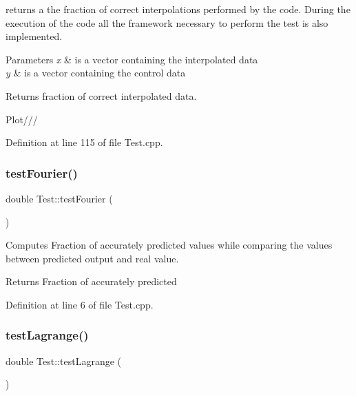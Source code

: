 returns a the fraction of correct interpolations performed by the code. During the execution of the code all the framework necessary to perform the test is also implemented. 


\begin{DoxyParams}{Parameters}
{\em x} & is a vector containing the interpolated data \\
\hline
{\em y} & is a vector containing the control data \\
\hline
\end{DoxyParams}
\begin{DoxyReturn}{Returns}
fraction of correct interpolated data. 
\end{DoxyReturn}
Plot/// 

Definition at line 115 of file Test.\+cpp.

\mbox{\label{class_test_a4789b9d0192ae0a3c6f88a7777a6bc57}} 
\subsubsection{\texorpdfstring{test\+Fourier()}{testFourier()}}
{\footnotesize\ttfamily double Test\+::test\+Fourier (\begin{DoxyParamCaption}{ }\end{DoxyParamCaption})}



Computes Fraction of accurately predicted values while comparing the values between predicted output and real value. 

\begin{DoxyReturn}{Returns}
Fraction of accurately predicted 
\end{DoxyReturn}


Definition at line 6 of file Test.\+cpp.

\mbox{\label{class_test_ae43e2b7e77bbd96d43684c78ca4ee836}} 
\subsubsection{\texorpdfstring{test\+Lagrange()}{testLagrange()}}
{\footnotesize\ttfamily double Test\+::test\+Lagrange (\begin{DoxyParamCaption}{ }\end{DoxyParamCaption})}



